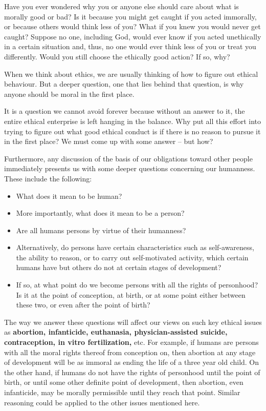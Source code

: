 \documentclass[
]{book}
\providecommand{\tightlist}{%
  \setlength{\itemsep}{0pt}\setlength{\parskip}{0pt}}
\begin{document}
Have you ever wondered why you or anyone else should care about what is morally good or bad? Is it because you might get caught if you acted immorally, or because others would think less of you? What if you knew you would never get caught? Suppose no one, including God, would ever know if you acted unethically in a certain situation and, thus, no one would ever think less of you or treat you differently. Would you still choose the ethically good action? If so, why?

When we think about ethics, we are usually thinking of how to figure out ethical behaviour. But a deeper question, one that lies behind that question, is why anyone should be moral in the first place.

It is a question we cannot avoid forever because without an answer to it, the entire ethical enterprise is left hanging in the balance. Why put all this effort into trying to figure out what good ethical conduct is if there is no reason to pursue it in the first place? We must come up with some answer -- but how?

Furthermore, any discussion of the basis of our obligations toward other people immediately presents us with some deeper questions concerning our humanness. These include the following:

\begin{itemize}
\tightlist
\item
  What does it mean to be human?
\item
  More importantly, what does it mean to be a person?
\item
  Are all humans persons by virtue of their humanness?
\item
  Alternatively, do persons have certain characteristics such as self-awareness, the ability to reason, or to carry out self-motivated activity, which certain humans have but others do not at certain stages of development?
\item
  If so, at what point do we become persons with all the rights of personhood? Is it at the point of conception, at birth, or at some point either between these two, or even after the point of birth?
\end{itemize}

The way we answer these questions will affect our views on such key ethical issues as \textbf{abortion, infanticide, euthanasia, physician-assisted suicide, contraception, in vitro fertilization,} etc. For example, if humans are persons with all the moral rights thereof from conception on, then abortion at any stage of development will be as immoral as ending the life of a three year old child. On the other hand, if humans do not have the rights of personhood until the point of birth, or until some other definite point of development, then abortion, even infanticide, may be morally permissible until they reach that point. Similar reasoning could be applied to the other issues mentioned here.
\end{document}
